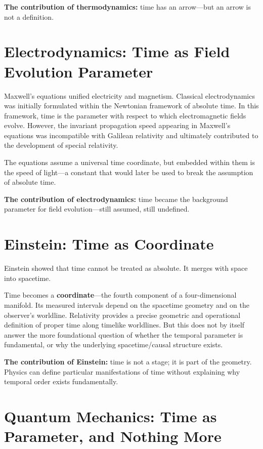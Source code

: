 \documentclass[12pt, a4paper]{article}
\begin{document}
\textbf{The contribution of thermodynamics:} time has an arrow---but an arrow is not a definition.

\section{Electrodynamics: Time as Field Evolution Parameter}

Maxwell's equations unified electricity and magnetism. Classical electrodynamics was initially formulated within the Newtonian framework of absolute time. In this framework, time is the parameter with respect to which electromagnetic fields evolve. However, the invariant propagation speed appearing in Maxwell's equations was incompatible with Galilean relativity and ultimately contributed to the development of special relativity.

The equations assume a universal time coordinate, but embedded within them is the speed of light---a constant that would later be used to break the assumption of absolute time.

\textbf{The contribution of electrodynamics:} time became the background parameter for field evolution---still assumed, still undefined.

\section{Einstein: Time as Coordinate}

Einstein showed that time cannot be treated as absolute. It merges with space into spacetime.

Time becomes a \textbf{coordinate}---the fourth component of a four-dimensional manifold. Its measured intervals depend on the spacetime geometry and on the observer's worldline. Relativity provides a precise geometric and operational definition of proper time along timelike worldlines. But this does not by itself answer the more foundational question of whether the temporal parameter is fundamental, or why the underlying spacetime/causal structure exists.

\textbf{The contribution of Einstein:} time is not a stage; it is part of the geometry. Physics can define particular manifestations of time without explaining why temporal order exists fundamentally.

\section{Quantum Mechanics: Time as Parameter, and Nothing More}
\end{document}

